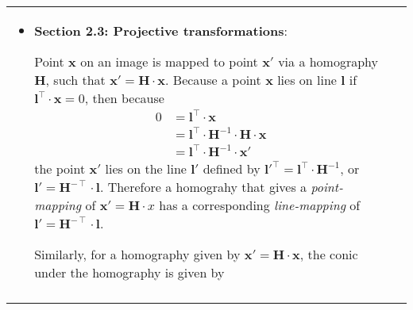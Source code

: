 \begin{longtable}{l p{12cm} }
{\begin{itemize}
\begin{itemize}
\begin{equation*}
\begin{split}
0&=\mathbf{x}^\intercal\cdot\mathbf{C}\cdot\mathbf{x}\\
&=\left[\begin{array}{ccc}x & y & 1\end{array} \right]\cdot
\left[\begin{array}{ccc}a & b/2 & d/2 \\ b/2 & c & e/2 \\ d/2 & e/2 & f\\\end{array}\right]\cdot\left[\begin{array}{c}x \\ y \\ 1 \end{array}\right]\\
&=a\cdot{x}^2+b\cdot{xy}+c\cdot{y}^2+d\cdot{x}+e\cdot{y}+f\cdot{1}
\end{split}
\end{equation*}
\item \textbf{Section 2.3: Projective transformations}:\newline
\par Point $\mathbf{x}$ on an image is mapped to point $\mathbf{x'}$ via a homography $\mathbf{H}$, such that $\mathbf{x'}=\mathbf{H}\cdot\mathbf{x}$. Because a point $\mathbf{x}$ lies on line $\mathbf{l}$ if $\mathbf{l}^\intercal\cdot\mathbf{x}=0$, then because 
\begin{equation*}
\begin{split}
0&=\mathbf{l}^\intercal\cdot\mathbf{x}\\
&=\mathbf{l}^\intercal\cdot\mathbf{H}^{-1}\cdot\mathbf{H}\cdot\mathbf{x}\\
&=\mathbf{l}^\intercal\cdot\mathbf{H}^{-1}\cdot\mathbf{x'}
\end{split}
\end{equation*}
the point $\mathbf{x'}$ lies on the line $\mathbf{l'}$ defined by $\mathbf{l'}^\intercal=\mathbf{l}^\intercal\cdot\mathbf{H}^{-1}$, or $\mathbf{l'}=\mathbf{H}^{-\intercal}\cdot\mathbf{l}$. Therefore a homograhy that gives a \textit{point-mapping} of $\mathbf{x'}=\mathbf{H}\cdot{x}$ has a corresponding \textit{line-mapping} of $\mathbf{l'}=\mathbf{H}^{-\intercal}\cdot\mathbf{l}$.\newline
\par Similarly, for a homography given by $\mathbf{x'}=\mathbf{H}\cdot\mathbf{x}$, the conic under the homography is given by 
\begin{equation*}
\begin{split}

\end{split}
\end{equation*}
\end{itemize}
\end{itemize}}
\end{longtable}
